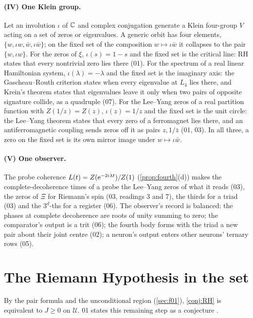 \documentclass[11pt]{article}
\theoremstyle{definition}\newtheorem{definition}[theorem]{Definition}
\theoremstyle{remark}\newtheorem{remark}[theorem]{Remark}
\begin{document}
\paragraph{(IV) One Klein group.} Let an involution $\iota$ of $\mathbb C$ and complex conjugation generate a Klein four-group $V$ acting on a set of zeros or eigenvalues. A generic orbit has four elements, $\{w,\iota w,\bar w,\iota\bar w\}$; on the fixed set of the composition $w\mapsto\iota\bar w$ it collapses to the pair $\{w,\iota w\}$. For the zeros of $\xi$, $\iota(s)=1-s$ and the fixed set is the critical line: RH states that every nontrivial zero lies there (01). For the spectrum of a real linear Hamiltonian system, $\iota(\lambda)=-\lambda$ and the fixed set is the imaginary axis: the Gascheau--Routh criterion states when every eigenvalue at $L_4$ lies there, and Krein's theorem states that eigenvalues leave it only when two pairs of opposite signature collide, as a quadruple (07). For the Lee--Yang zeros of a real partition function with $Z(1/z)=Z(z)$, $\iota(z)=1/z$ and the fixed set is the unit circle: the Lee--Yang theorem states that every zero of a ferromagnet lies there, and an antiferromagnetic coupling sends zeros off it as pairs $z,1/\bar z$ (01, 03). In all three, a zero on the fixed set is its own mirror image under $w\mapsto\iota\bar w$.

\paragraph{(V) One observer.} The probe coherence $L(t)=Z(\mathrm e^{-2i\lambda t})/Z(1)$ (\cref{prop:fourth}(d)) makes the complete-decoherence times of a probe the Lee--Yang zeros of what it reads (03), the zeros of $\Xi$ for Riemann's spin (03, readings 3 and 7), the thirds for a triad (03) and the $3^d$-ths for a register (06). The observer's record is balanced: the phases at complete decoherence are roots of unity summing to zero; the comparator's output is a trit (06); the fourth body forms with the triad a new pair about their joint centre (02); a neuron's output enters other neurons' ternary rows (05).

\section{The Riemann Hypothesis in the set}\label{sec:rh}
By the pair formula and the unconditional region (\cref{sec:f01}), \cref{conj:RH} is equivalent to $J\ge0$ on $\mathcal U$. 01 states this remaining step as a conjecture \cite{SMath}.
\end{document}
